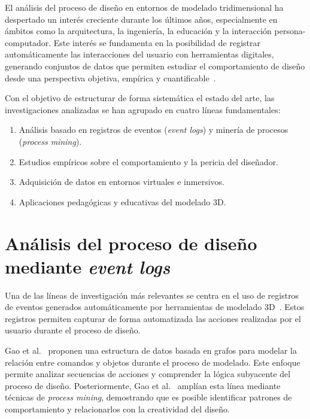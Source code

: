 
El análisis del proceso de diseño en entornos de modelado tridimensional ha despertado un interés creciente durante los últimos años, especialmente en ámbitos como la arquitectura, la ingeniería, la educación y la interacción persona-computador. Este interés se fundamenta en la posibilidad de registrar automáticamente las interacciones del usuario con herramientas digitales, generando conjuntos de datos que permiten estudiar el comportamiento de diseño desde una perspectiva objetiva, empírica y cuantificable~\cite{gao2021,gao2023,jankowski2014}.

Con el objetivo de estructurar de forma sistemática el estado del arte, las investigaciones analizadas se han agrupado en cuatro líneas fundamentales:
\begin{enumerate}
    \item Análisis basado en registros de eventos (\textit{event logs}) y minería de procesos (\textit{process mining}).
    \item Estudios empíricos sobre el comportamiento y la pericia del diseñador.
    \item Adquisición de datos en entornos virtuales e inmersivos.
    \item Aplicaciones pedagógicas y educativas del modelado 3D.
\end{enumerate}

\section{Análisis del proceso de diseño mediante \textit{event logs}}

Una de las líneas de investigación más relevantes se centra en el uso de registros de eventos generados automáticamente por herramientas de modelado 3D~\cite{gao2021,liu2022}. Estos registros permiten capturar de forma automatizada las acciones realizadas por el usuario durante el proceso de diseño.

Gao et al.~\cite{gao2021} proponen una estructura de datos basada en grafos para modelar la relación entre comandos y objetos durante el proceso de modelado. Este enfoque permite analizar secuencias de acciones y comprender la lógica subyacente del proceso de diseño. Posteriormente, Gao et al.~\cite{gao2023} amplían esta línea mediante técnicas de \textit{process mining}, demostrando que es posible identificar patrones de comportamiento y relacionarlos con la creatividad del diseño.

